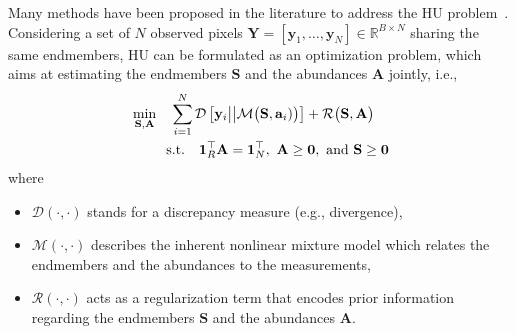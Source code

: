 \documentclass[journal,a4paper]{IEEEtran}
\newcommand{\bfY}{\mathbf{Y}}
\newcommand{\bfy}{\mathbf{y}}
\newcommand{\bfa}{\mathbf{a}}
\newcommand{\bTheta}{\boldsymbol{\Theta}}
\newcommand{\MATabund}{\mathbf{A}}
\newcommand{\MATend}{\mathbf{S}}
\begin{document}
Many methods have been proposed in the literature to address the HU problem~\cite{dong2020spectral,zhao2021hyperspectralNMF,palsson2020convolutional,gao2021cycu,ozkan2018endnet}. Considering a set of $N$ observed pixels $\bfY=\left[\bfy_1,\ldots,\bfy_N\right] \in \mathbb{R}^{B\times N}$ sharing the same endmembers, HU can be formulated as an optimization problem, which aims at estimating the endmembers $\MATend$ and the abundances $\MATabund$ jointly, i.e.,  
 \begin{equation}
\begin{split}\label{eq.general_model}
            &\mathop{\rm min}_{\MATend,  \MATabund} \quad \sum_{i=1}^N \mathcal{D}\left[\bfy_i \big|\big| {\mathcal{M}}\big(\MATend, \bfa_i)\big)\right] + \mathcal{R}\big(\MATend, \MATabund\big)\\      
            & \qquad\;\; {\rm s.t. } \quad   \boldsymbol{1}_{R}^{\top}\MATabund=\boldsymbol{1}_{N}^{\top},~\MATabund\geq  \boldsymbol{0}, ~\text{and}~ \MATend\geq \boldsymbol{0}
    \end{split}
\end{equation}
where 
\begin{itemize}
\item $\mathcal{D}(\cdot,\cdot)$ stands for a discrepancy measure (e.g., divergence),
\item $\mathcal{M}(\cdot,\cdot)$ describes the inherent nonlinear mixture model which relates the endmembers and the abundances to the measurements, 
\item $\mathcal{R}(\cdot,\cdot)$ acts as a regularization term that encodes prior information regarding the endmembers $\MATend$ and the abundances $\MATabund$.
\end{itemize}
\end{document}
